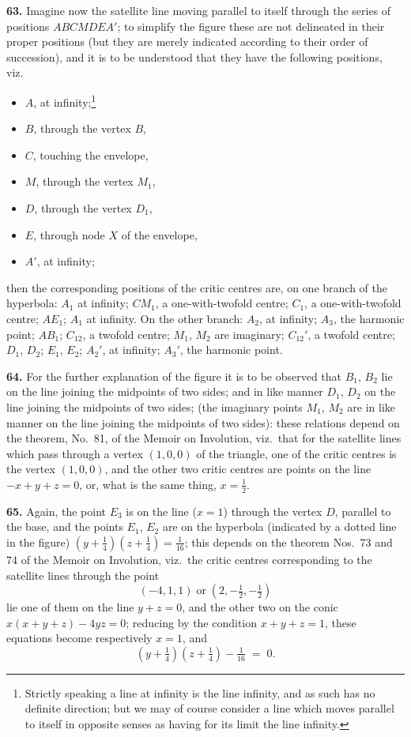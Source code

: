 \documentclass[11pt,a4paper]{article}
\begin{document}
\textbf{63.} Imagine now the satellite line moving parallel to itself through the series of positions $A B C M D E A'$; to simplify the figure these are not delineated in their proper positions (but they are merely indicated according to their order of succession), and it is to be understood that they have the following positions, viz.\
\begin{itemize}\itemsep0pt
\item $A$, at infinity;\footnote{Strictly speaking a line at infinity is the line infinity, and as such has no definite direction; but we may of course consider a line which moves parallel to itself in opposite senses as having for its limit the line infinity.}
\item $B$, through the vertex $B$,
\item $C$, touching the envelope,
\item $M$, through the vertex $M_{1}$,
\item $D$, through the vertex $D_{1}$,
\item $E$, through node $X$ of the envelope,
\item $A'$, at infinity;
\end{itemize}
then the corresponding positions of the critic centres are, on one branch of the hyperbola: $A_{1}$ at infinity; $CM_{1}$, a one-with-twofold centre; $C_{1}$, a one-with-twofold centre; $AE_{1}$; $A_{1}$ at infinity. On the other branch: $A_{2}$, at infinity; $A_{3}$, the harmonic point; $A B_{1}$; $C_{12}$, a twofold centre; $M_{1}$, $M_{2}$ are imaginary; $C_{12}'$, a twofold centre; $D_{1}$, $D_{2}$; $E_{1}$, $E_{2}$; $A_{2}'$, at infinity; $A_{3}'$, the harmonic point.

\medskip

\textbf{64.} For the further explanation of the figure it is to be observed that $B_{1}$, $B_{2}$ lie on the line joining the midpoints of two sides; and in like manner $D_{1}$, $D_{2}$ on the line joining the midpoints of two sides; (the imaginary points $M_{1}$, $M_{2}$ are in like manner on the line joining the midpoints of two sides): these relations depend on the theorem, No.~81, of the Memoir on Involution, viz.\ that for the satellite lines which pass through a vertex $(1,0,0)$ of the triangle, one of the critic centres is the vertex $(1,0,0)$, and the other two critic centres are points on the line $-x+y+z=0$, or, what is the same thing, $x=\tfrac{1}{2}$.

\medskip

\textbf{65.} Again, the point $E_{3}$ is on the line ($x=1$) through the vertex $D$, parallel to the base, and the points $E_{1}$, $E_{2}$ are on the hyperbola (indicated by a dotted line in the figure) $(y+\tfrac{1}{4})(z+\tfrac{1}{4})=\tfrac{1}{16}$; this depends on the theorem Nos.~73 and 74 of the Memoir on Involution, viz.\ the critic centres corresponding to the satellite lines through the point
\[
(-4,1,1)\;\text{or}\;(2,-\tfrac{1}{2},-\tfrac{1}{2})
\]
lie one of them on the line $y+z=0$, and the other two on the conic $x(x+y+z)-4yz=0$; reducing by the condition $x+y+z=1$, these equations become respectively $x=1$, and
\[
(y+\tfrac{1}{4})(z+\tfrac{1}{4})-\tfrac{1}{16} \;=\; 0.
\]
\end{document}
